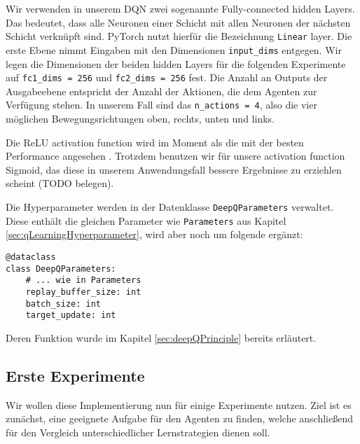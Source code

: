 Wir verwenden in unserem DQN zwei sogenannte Fully-connected hidden Layers. Das bedeutet, dass alle Neuronen einer Schicht mit allen Neuronen der nächsten Schicht verknüpft sind. PyTorch nutzt hierfür die Bezeichnung \texttt{Linear} layer. Die erste Ebene nimmt Eingaben mit den Dimensionen \texttt{input_dims} entgegen. Wir legen die Dimensionen der beiden hidden Layers für die folgenden Experimente auf \texttt{fc1_dims = 256} und \texttt{fc2_dims = 256} fest. Die Anzahl an Outputs der Ausgabeebene entspricht der Anzahl der Aktionen, die dem Agenten zur Verfügung stehen. In unserem Fall sind das \texttt{n_actions = 4}, also die vier möglichen Bewegungsrichtungen oben, rechts, unten und links.

Die ReLU activation function wird im Moment als die mit der besten Performance angesehen \cite{10_stevens2020deep}. Trotzdem benutzen wir für unsere activation function Sigmoid, das diese in unserem Anwendungsfall bessere Ergebnisse zu erziehlen scheint (TODO belegen). 

Die Hyperparameter werden in der Datenklasse \texttt{DeepQParameters} verwaltet. Diese enthält die gleichen Parameter wie \texttt{Parameters} aus Kapitel \ref{sec:qLearningHyperparameter}, wird aber noch um folgende ergänzt:
\begin{verbatim}
@dataclass
class DeepQParameters:
    # ... wie in Parameters
    replay_buffer_size: int
    batch_size: int
    target_update: int
\end{verbatim}
Deren Funktion wurde im Kapitel \ref{sec:deepQPrinciple} bereits erläutert.

\subsection{Erste Experimente}
Wir wollen diese Implementierung nun für einige Experimente nutzen. Ziel ist es zunächst, eine geeignete Aufgabe für den Agenten zu finden, welche anschließend für den Vergleich unterschiedlicher Lernstrategien dienen soll.

